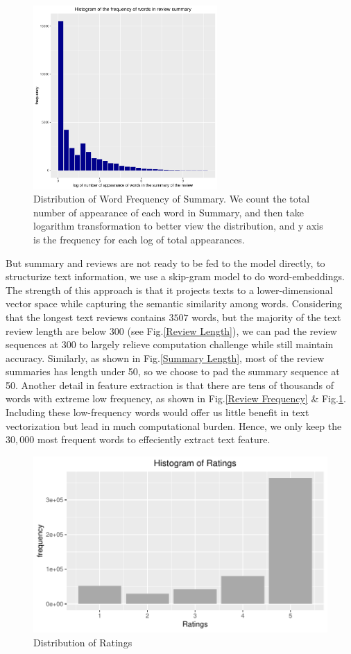 \documentclass[letterpaper]{article} %
\begin{document}
\begin{figure}[!h]
\centering
\includegraphics[height=7cm,width=0.9\columnwidth]{pics//plot_r_freq.pdf}  
\caption{Distribution of Word Frequency of Summary. We count the total number of appearance of each word in Summary, and then take logarithm transformation to better view the distribution, and y axis is the frequency for each log of total appearances.}
\label{Summary Frequency}
\end{figure}

But summary and reviews are not ready to be fed to the model directly, to structurize text information, we use a skip-gram model to do word-embeddings. The strength of this approach is that it projects texts to a lower-dimensional vector space while capturing the semantic similarity among words. Considering that the longest text reviews contains $3507$ words, but the majority of the text review length are below $300$ (see Fig.\ref{Review Length}), we can pad the review sequences at 300 to largely relieve computation challenge while still maintain accuracy. Similarly, as shown in Fig.\ref{Summary Length}, most of the review summaries has length under 50, so we choose to pad the summary sequence at 50. Another detail in feature extraction is that there are tens of thousands of words with extreme low frequency, as shown in Fig.\ref{Review Frequency} \& Fig.\ref{Summary Frequency}. Including these low-frequency words would offer us little benefit in text vectorization but lead in much computational burden. Hence, we only keep the $30,000$ most frequent words to effeciently extract text feature.

\begin{figure}[!h]
\centering
\includegraphics[width=0.9\columnwidth]{plot_rating.pdf}
\caption{Distribution of Ratings}
\label{Dstribution of Ratings.}
\end{figure}
\end{document}
